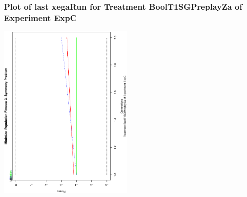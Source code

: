  \begin{frame}
 \frametitle{ Plot of last xegaRun for Treatment BoolT1SGPreplayZa of Experiment ExpC }
 \begin{center}
\includegraphics[width=0.5\textwidth, angle=-90]
{ExpCPlotPopStatsFigure002.eps}
 \end{center}
 \label{report/ExpCPlotPopStatsFigure002.eps}  
 \end{frame}

